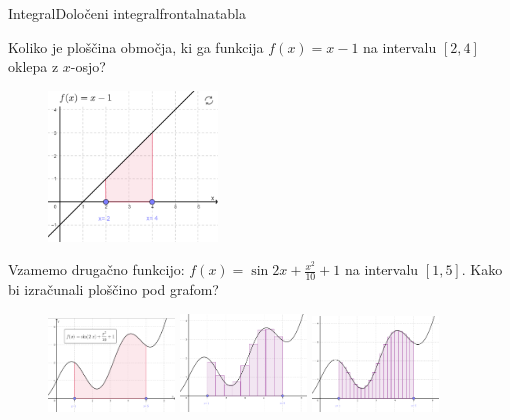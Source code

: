 \begin{priprava}{}{}{Integral}{Določeni integral}{frontalna}{tabla}



Koliko je ploščina območja, ki ga funkcija $ f(x) = x - 1 $ na intervalu $ [2, 4] $ oklepa z $ x $-osjo? 

\begin{figure}[h]
    \centering
    \includegraphics[width=0.4\textwidth]{slike/dol_int_motivacijski_primer.png}
\end{figure}

 Vzamemo drugačno funkcijo: $ f(x) = \sin{2x}+\frac{x^2}{10} + 1 $ na intervalu $ [1,5] $. Kako bi izračunali ploščino pod grafom?

\begin{figure}[h]
    \centering
    \includegraphics[width=0.3\textwidth]{slike/dol_int_motivacijski_primer2.png}
    \includegraphics[width=0.3\textwidth]{slike/midpoint.png}
    \includegraphics[width=0.3\textwidth]{slike/midpoint2.png}    
\end{figure}



\end{priprava}
